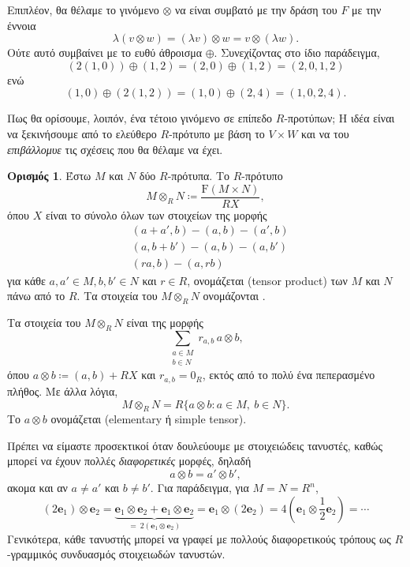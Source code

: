 \documentclass[12pt,a4paper,reqno]{amsart}
\theoremstyle{definition}
\newtheorem{definition}[theorem]{Ορισμός}
\theoremstyle{remark}
\numberwithin{theorem}{section}
\numberwithin{exercise}{section}
\numberwithin{equation}{section}
\newcommand{\bfe}{\mathbf{e}}
\newcommand{\rmF}{\mathrm{F}}
\newcommand{\defn}[1]{{\color{mylightblue}{#1}}}
\begin{document}
Επιπλέον, θα θέλαμε το γινόμενο $\otimes$ να είναι συμβατό με την δράση του $F$ με την έννοια 
\[
\lambda (v \otimes w) = (\lambda{v}) \otimes w = v \otimes (\lambda{w}).
\]
Ούτε αυτό συμβαίνει με το ευθύ άθροισμα $\oplus$. Συνεχίζοντας στο ίδιο παράδειγμα, 
\[
\left(2(1,0)\right) \oplus (1,2) = (2,0) \oplus (1,2) = (2,0,1,2) 
\]
ενώ 
\[
(1,0) \oplus \left(2(1,2)\right) = (1,0) \oplus (2,4) = (1,0,2,4). 
\]


Πως θα ορίσουμε, λοιπόν, ένα τέτοιο γινόμενο σε επίπεδο $R$-προτύπων; Η ιδέα είναι να ξεκινήσουμε από το ελεύθερο $R$-πρότυπο με βάση το $V \times W$ και να του \emph{επιβάλλομυε} τις σχέσεις που θα θέλαμε να έχει.

\begin{definition}
    \label{def:tensor_product}
    Έστω $M$ και $N$ δύο $R$-πρότυπα. Το $R$-πρότυπο 
    \[
    M \otimes_R N \coloneqq \frac{\rmF(M \times N)}{RX},
    \]
    όπου $X$ είναι το σύνολο όλων των στοιχείων της μορφής
    \begin{align*}
        &(a + a', b) - (a,b) - (a',b) \\
        &(a , b + b') - (a,b) - (a,b') \\
        &(ra,b) - (a,rb)
    \end{align*}
    για κάθε $a, a' \in M, b, b' \in N$ και $r \in R$, ονομάζεται \defn{τανυστικό γινόμενο} (tensor product) των $M$ και $N$ πάνω από το $R$. Τα στοιχεία του $M \otimes_R N$ ονομάζονται \defn{τανυστές}.
\end{definition}

Τα στοιχεία του $M \otimes_R N$ είναι της μορφής 
\[
\sum_{\substack{a \in M \\ b \in N}} r_{a,b} \, a \otimes b,
\]
όπου $a \otimes b \coloneqq (a,b) + RX$ και $r_{a,b} = 0_R$, εκτός από το πολύ ένα πεπερασμένο πλήθος. Με άλλα λόγια, 
\[
M \otimes_R N = R\{a \otimes b : a \in M, \ b \in N\}.
\]
Το $a \otimes b$ ονομάζεται \defn{στοιχειώδης τανυστής} (elementary ή simple tensor).

Πρέπει να είμαστε προσεκτικοί όταν δουλεύουμε με στοιχειώδεις τανυστές, καθώς μπορεί να έχουν πολλές \emph{διαφορετικές} μορφές, δηλαδή 
\[
a \otimes b = a' \otimes b',
\]
ακομα και αν $a \neq a'$ και $b \neq b'$. Για παράδειγμα, για $M = N = R^n$,
\[
(2\bfe_1) \otimes \bfe_2 = \underbrace{\bfe_1 \otimes \bfe_2 + \bfe_1 \otimes \bfe_2}_{= \ 2\left(\bfe_1 \otimes \bfe_2\right)} = \bfe_1 \otimes (2\bfe_2) = 4\left(\bfe_1 \otimes \frac{1}{2}\bfe_2\right) = \cdots
\]
Γενικότερα, κάθε τανυστής μπορεί να γραφεί με πολλούς διαφορετικούς τρόπους ως $R$-γραμμικός συνδυασμός στοιχειωδών τανυστών.
\end{document}
